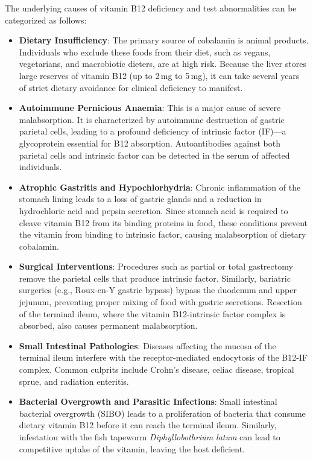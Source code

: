 The underlying causes of vitamin B12 deficiency and test abnormalities can be categorized as follows:
\begin{itemize}
    \item \textbf{Dietary Insufficiency}: The primary source of cobalamin is animal products. Individuals who exclude these foods from their diet, such as vegans, vegetarians, and macrobiotic dieters, are at high risk. Because the liver stores large reserves of vitamin B12 (up to 2\,mg to 5\,mg), it can take several years of strict dietary avoidance for clinical deficiency to manifest.
    \item \textbf{Autoimmune Pernicious Anaemia}: This is a major cause of severe malabsorption. It is characterized by autoimmune destruction of gastric parietal cells, leading to a profound deficiency of intrinsic factor (IF)---a glycoprotein essential for B12 absorption. Autoantibodies against both parietal cells and intrinsic factor can be detected in the serum of affected individuals.
    \item \textbf{Atrophic Gastritis and Hypochlorhydria}: Chronic inflammation of the stomach lining leads to a loss of gastric glands and a reduction in hydrochloric acid and pepsin secretion. Since stomach acid is required to cleave vitamin B12 from its binding proteins in food, these conditions prevent the vitamin from binding to intrinsic factor, causing malabsorption of dietary cobalamin.
    \item \textbf{Surgical Interventions}: Procedures such as partial or total gastrectomy remove the parietal cells that produce intrinsic factor. Similarly, bariatric surgeries (e.g., Roux-en-Y gastric bypass) bypass the duodenum and upper jejunum, preventing proper mixing of food with gastric secretions. Resection of the terminal ileum, where the vitamin B12-intrinsic factor complex is absorbed, also causes permanent malabsorption.
    \item \textbf{Small Intestinal Pathologies}: Diseases affecting the mucosa of the terminal ileum interfere with the receptor-mediated endocytosis of the B12-IF complex. Common culprits include Crohn's disease, celiac disease, tropical sprue, and radiation enteritis.
    \item \textbf{Bacterial Overgrowth and Parasitic Infections}: Small intestinal bacterial overgrowth (SIBO) leads to a proliferation of bacteria that consume dietary vitamin B12 before it can reach the terminal ileum. Similarly, infestation with the fish tapeworm \textit{Diphyllobothrium latum} can lead to competitive uptake of the vitamin, leaving the host deficient.

\end{itemize}
